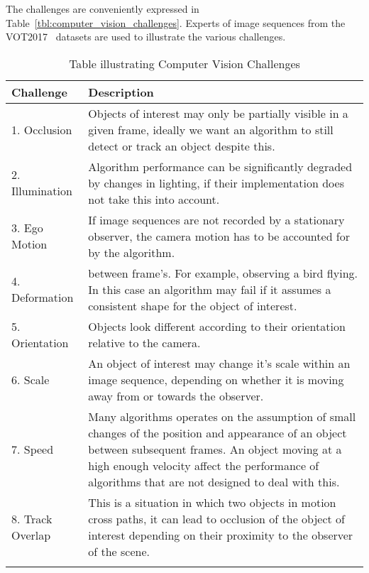 The challenges are conveniently expressed in
Table~\ref{tbl:computer_vision_challenges}. Experts of image sequences 
from the VOT2017~\cite{VOT_TPAMI} datasets are used to illustrate the various
challenges.

\begin{longtable}{p{5cm}  p{8cm}}
    \hline
    \textbf{Challenge} & \textbf{Description} \\ 
    \hline\hline
    
    1. Occlusion
    & 
    Objects of interest may only be partially visible in a
    given frame, ideally we want an algorithm to still detect or
    track an object despite this.
    \\ \bottomrule
    
    2. Illumination
    &
    Algorithm performance can be significantly degraded by changes
    in lighting, if their implementation does not take this into
    account.
    \\ \bottomrule
    
    3. Ego Motion
    &
    If image sequences are not recorded by a stationary observer,
    the camera motion has to be accounted for by the algorithm.
    \\ \bottomrule
    
    4. Deformation
    &
    between frame's. For example, observing a bird flying. In this
    case an algorithm may fail if it assumes a consistent shape for
    the object of interest.
    \\ \bottomrule

    5. Orientation
    &
    Objects look different according to their orientation relative
    to the camera.
    \\ \bottomrule

    6. Scale
    &
    An object of interest may change it's scale within an image
    sequence, depending on whether it is moving away from or towards
    the observer.
    \\ \bottomrule

    7. Speed 
    &
    Many algorithms operates on the assumption of small
    changes of the position and appearance of an object between
    subsequent frames. An object moving at a high enough velocity
    affect the performance of algorithms that are not designed to
    deal with this.
    \\ \bottomrule
  
    8. Track Overlap
    &
    This is a situation in which two objects in motion cross paths, it can lead
    to occlusion of the object of interest depending on their proximity to the
    observer of the scene.
    \\ \bottomrule

    \caption{Table illustrating Computer Vision Challenges}
\end{longtable}\label{tbl:computer_vision_challenges}





